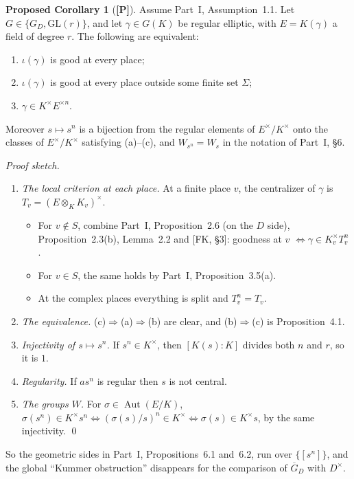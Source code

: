 \documentclass[11pt]{article}
\newcommand{\GL}{\mathrm{GL}}
\newcommand{\GDb}{\overline G_D}
\theoremstyle{definition}
\newtheorem*{prop*}{Proposed Corollary}
\begin{document}
\begin{prop*}[\textbf{[P]}]
Assume Part~I, Assumption~1.1. Let $G\in\{G_D,\GL(r)\}$, and let
$\gamma\in G(K)$ be regular elliptic, with $E=K(\gamma)$ a field of degree
$r$. The following are equivalent:
\begin{enumerate}[label=(\alph*)]
\item $\iota(\gamma)$ is good at every place;
\item $\iota(\gamma)$ is good at every place outside some finite set
$\Sigma$;
\item $\gamma\in K^\times E^{\times n}$.
\end{enumerate}
Moreover $s\mapsto s^n$ is a bijection from the regular elements of
$E^\times/K^\times$ onto the classes of $E^\times/K^\times$ satisfying
(a)--(c), and $W_{s^n}=W_s$ in the notation of Part~I, \S6.
\end{prop*}

\noindent\emph{Proof sketch.}
\begin{enumerate}[label=(\roman*)]
\item \emph{The local criterion at each place.} At a finite place $v$, the
centralizer of $\gamma$ is $T_v=(E\otimes_KK_v)^\times$.
\begin{itemize}
\item For $v\notin S$, combine Part~I, Proposition~2.6 (on the $D$ side),
Proposition~2.3(b), Lemma~2.2 and [FK, \S3]: goodness at $v$
$\iff\gamma\in K_v^\times T_v^n$.
\item For $v\in S$, the same holds by Part~I, Proposition~3.5(a).
\item At the complex places everything is split and $T_v^n=T_v$.
\end{itemize}
\item \emph{The equivalence.} (c)$\Rightarrow$(a)$\Rightarrow$(b) are
clear, and (b)$\Rightarrow$(c) is Proposition~4.1.
\item \emph{Injectivity of $s\mapsto s^n$.} If $s^n\in K^\times$, then
$[K(s):K]$ divides both $n$ and $r$, so it is $1$.
\item \emph{Regularity.} If $a s^n$ is regular then $s$ is not central.
\item \emph{The groups $W$.} For $\sigma\in\operatorname{Aut}(E/K)$,
$\sigma(s^n)\in K^\times s^n\iff(\sigma(s)/s)^n\in K^\times\iff
\sigma(s)\in K^\times s$, by the same injectivity. \qed
\end{enumerate}

So the geometric sides in Part~I, Propositions~6.1 and~6.2, run over
$\{[s^n]\}$, and the global ``Kummer obstruction'' disappears for the
comparison of $\GDb$ with $D^\times$.
\end{document}
